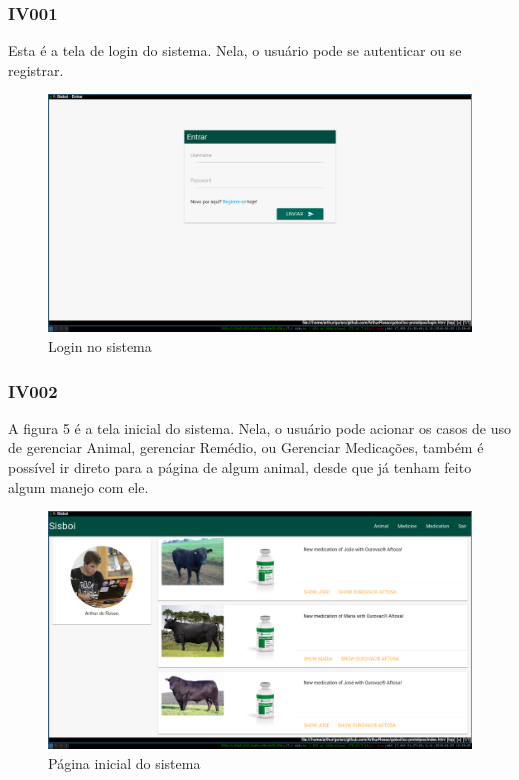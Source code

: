 \documentclass[12pt]{article}
\begin{document}
\subsubsection{IV001}

Esta é a tela de login do sistema. Nela, o usuário pode se autenticar ou se registrar.
\begin{figure}[!h]
	\begin{center}
		\caption{Login no sistema}
		\includegraphics[width=13cm]{img/prototipos/login.png}


	\end{center}
\end{figure}

\subsubsection{IV002}

A figura 5 é a tela inicial do sistema. Nela, o usuário pode acionar os casos de uso de gerenciar Animal, gerenciar Remédio, ou Gerenciar Medicações, também é possível ir direto para a página de algum animal, desde que já tenham feito algum manejo com ele.
\begin{figure}[!h]
	\begin{center}
		\caption{Página inicial do sistema}
		\includegraphics[width=13cm]{img/prototipos/index.png}


	\end{center}
\end{figure}
\end{document}
